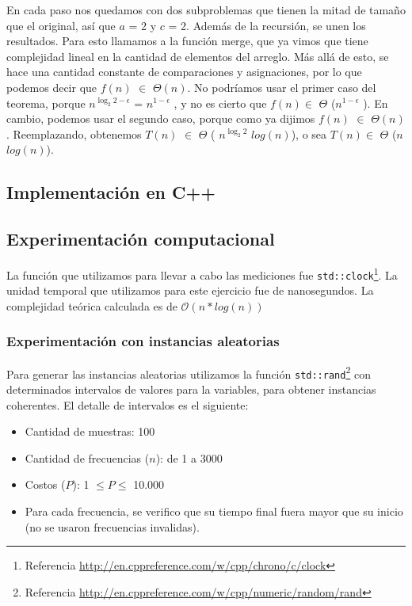 En cada paso nos quedamos con dos subproblemas que tienen la mitad de tamaño que el original, así que $a$ = 2 y $c$ = 2. Además de la recursión, se unen los resultados. Para esto llamamos a la función merge, que ya vimos que tiene complejidad lineal en la cantidad de elementos del arreglo. Más allá de esto, se hace una cantidad constante de comparaciones y asignaciones, por lo que podemos decir que $f(n)$  $\in$  $\Theta
(n)$. No podríamos usar el primer caso del teorema, porque $n^{\log_2 2-\epsilon}$ = $n^{1 - \epsilon}$ , y no es cierto que $f(n) \in$  $\Theta$ ($n^{1 - \epsilon}$ ). En cambio, podemos usar el segundo caso, porque como ya dijimos $f(n)$ $\in$ $\Theta (n)$ . Reemplazando, obtenemos $T(n)$ $\in$
 $\Theta$ ( $n^{\log_2 2}$  $log (n)$), o sea $T(n) \in$  $\Theta$ ($n$  $log (n)$).

\newpage
\subsection{Implementación en C++}


\subsection{Experimentación computacional}
La función que utilizamos para llevar a cabo las mediciones fue \texttt{std::clock}\footnote{Referencia \url{http://en.cppreference.com/w/cpp/chrono/c/clock}}. La unidad temporal que utilizamos para este ejercicio fue de nanosegundos.
La complejidad teórica calculada es de $\mathcal{O}(n*log(n))$

\subsubsection{Experimentación con instancias aleatorias}
Para generar las instancias aleatorias utilizamos la función \texttt{std::rand}\footnote{Referencia \url{http://en.cppreference.com/w/cpp/numeric/random/rand}} con determinados intervalos de valores para la variables, para obtener instancias coherentes. El detalle de intervalos es el siguiente:
\begin{itemize}
	\item Cantidad de muestras: 100
	\item Cantidad de frecuencias ($n$): de 1 a 3000
    \item Costos ($P$): 1 $\leq P \leq$ 10.000
	\item Para cada frecuencia, se verifico que su tiempo final fuera mayor que su inicio (no se usaron frecuencias invalidas).
\end{itemize}

